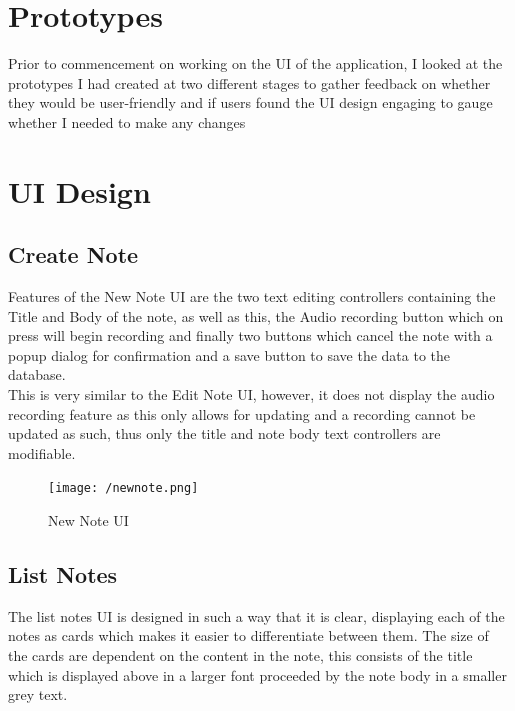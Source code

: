 \documentclass[oneside]{report}
\begin{document}
	\newpage

	\section{Prototypes}
	Prior to commencement on working on the UI of the application, I looked at the prototypes I had created at two different stages to gather feedback on whether they would be user-friendly and if users found the UI design engaging to gauge whether I needed to make any changes 		

	\section{UI Design}
		\subsection{Create Note}
		Features of the New Note UI are the two text editing controllers containing the Title and Body of the note, as well as this, the Audio recording button which on press will begin recording and finally two buttons which cancel the note with a popup dialog for confirmation and a save button to save the data to the database.\\

This is very similar to the Edit Note UI, however, it does not display the audio recording feature as this only allows for updating and a recording cannot be updated as such, thus only the title and note body text controllers are modifiable.\\

		\begin{figure}[H]
			\begin{center}
	 		 	\texttt{[image: /newnote.png]}
			\end{center}
			\caption[New Note UI]{New Note UI}
		\end{figure}


		\subsection{List Notes}
		The list notes UI is designed in such a way that it is clear, displaying each of the notes as cards which makes it easier to differentiate between them. The size of the cards are dependent on the content in the note, this consists of the title which is displayed above in a larger font proceeded by the note body in a smaller grey text.\\
\end{document}
